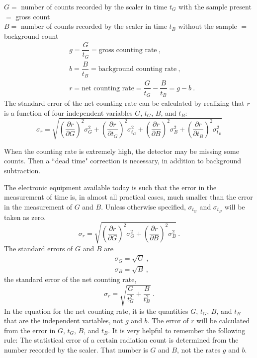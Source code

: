 \documentclass[12pt,a4paper]{article}
\begin{document}
$G =$ number of counts recorded by the scaler in time $t_G$ with the sample present $=$ gross count \\
$B =$ number of counts recorded by the scaler in time $t_B$ without the sample $=$ background count
\begin{align}
& g = \dfrac{G}{t_G} = \text{gross counting rate} ~, \\
& b = \dfrac{B}{t_B} = \text{background counting rate} ~, \\
& r = \text{net counting rate} = \dfrac{G}{t_G} -\dfrac{B}{t_B} = g -b ~.
\end{align}
The standard error of the net counting rate can be calculated by realizing that $r$ is a function of four independent variables $G$, $t_G$, $B$, and $t_B$:
\begin{equation}
\sigma_r = \sqrt{\left( \dfrac{\partial r}{\partial G} \right)^2 \sigma_G^2 +\left( \dfrac{\partial r}{\partial t_G} \right)^2 \sigma_{t_G}^2 +\left( \dfrac{\partial r}{\partial B} \right)^2 \sigma_B^2 +\left( \dfrac{\partial r}{\partial t_B} \right)^2 \sigma_{t_B}^2}
\end{equation}

When the counting rate is extremely high, the detector may be missing some counts. Then a ``dead time" correction is necessary, in addition to background subtraction.

The electronic equipment available today is such that the error in the measurement of time is, in almost all practical cases, much smaller than the error in the measurement of $G$ and $B$. Unless otherwise specified, $\sigma_{t_G}$ and $\sigma_{t_B}$ will be taken as zero.
\begin{equation}
\sigma_r = \sqrt{\left( \dfrac{\partial r}{\partial G} \right)^2 \sigma_G^2 +\left( \dfrac{\partial r}{\partial B} \right)^2 \sigma_B^2} ~.
\end{equation}
The standard errors of $G$ and $B$ are
\begin{align}
& \sigma_G = \sqrt{G} ~, \\
& \sigma_B = \sqrt{B} ~,
\end{align}
the standard error of the net counting rate,
\begin{equation}
\sigma_r = \sqrt{\dfrac{G}{t^2_G} +\dfrac{B}{t^2_B}} ~.
\end{equation}
In the equation for the net counting rate, it is the quantities $G$, $t_G$, $B$, and $t_B$ that are the independent variables, not $g$ and $b$. The error of $r$ will be calculated from the error in $G$, $t_G$, $B$, and $t_B$. It is very helpful to remember the following rule:  The statistical error of a certain radiation count is determined from the number recorded by the scaler.  That number is $G$ and $B$, not the rates $g$ and $b$.
\end{document}

